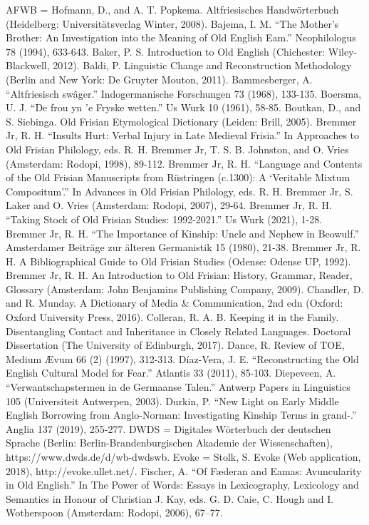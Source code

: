 AFWB = Hofmann, D., and A. T. Popkema. Altfriesisches Handwörterbuch (Heidelberg: Universitätsverlag Winter, 2008).
Bajema, I. M. “The Mother’s Brother: An Investigation into the Meaning of Old English Eam.” Neophilologus 78 (1994), 633-643.
Baker, P. S. Introduction to Old English (Chichester: Wiley-Blackwell, 2012).
Baldi, P. Linguistic Change and Reconstruction Methodology (Berlin and New York: De Gruyter Mouton, 2011).
Bammesberger, A. “Altfriesisch swâger.” Indogermanische Forschungen 73 (1968), 133-135.
Boersma, U. J. “De frou yn 'e Fryske wetten.” Us Wurk 10 (1961), 58-85.
Boutkan, D., and S. Siebinga. Old Frisian Etymological Dictionary (Leiden: Brill, 2005).
Bremmer Jr, R. H. “Insults Hurt: Verbal Injury in Late Medieval Frisia.” In Approaches to Old Frisian Philology, eds. R. H. Bremmer Jr, T. S. B. Johnston, and O. Vries (Amsterdam: Rodopi, 1998), 89-112.
Bremmer Jr, R. H. “Language and Contents of the Old Frisian Manuscripts from Rüstringen (c.1300): A ‘Veritable Mixtum Compositum’.” In Advances in Old Frisian Philology, eds. R. H. Bremmer Jr, S. Laker and O. Vries (Amsterdam: Rodopi, 2007), 29-64.
Bremmer Jr, R. H. “Taking Stock of Old Frisian Studies: 1992-2021.” Us Wurk (2021), 1-28.
Bremmer Jr, R. H. “The Importance of Kinship: Uncle and Nephew in Beowulf.” Amsterdamer Beiträge zur älteren Germanistik 15 (1980), 21-38.
Bremmer Jr, R. H. A Bibliographical Guide to Old Frisian Studies (Odense: Odense UP, 1992).
Bremmer Jr, R. H. An Introduction to Old Frisian: History, Grammar, Reader, Glossary (Amsterdam: John Benjamins Publishing Company, 2009).
Chandler, D. and R. Munday. A Dictionary of Media \& Communication, 2nd edn (Oxford: Oxford University Press, 2016).
Colleran, R. A. B. Keeping it in the Family. Disentangling Contact and Inheritance in Closely Related Languages. Doctoral Dissertation (The University of Edinburgh, 2017).
Dance, R. Review of TOE, Medium Ævum 66 (2) (1997), 312-313.
Díaz-Vera, J. E. “Reconstructing the Old English Cultural Model for Fear.” Atlantis 33 (2011), 85-103.
Diepeveen, A. “Verwantschapstermen in de Germaanse Talen.” Antwerp Papers in Linguistics 105 (Universiteit Antwerpen, 2003).
Durkin, P. “New Light on Early Middle English Borrowing from Anglo-Norman: Investigating Kinship Terms in grand-.” Anglia 137 (2019), 255-277.
DWDS = Digitales Wörterbuch der deutschen Sprache (Berlin: Berlin-Brandenburgischen Akademie der Wissenschaften), https://www.dwds.de/d/wb-dwdswb.
Evoke = Stolk, S. Evoke (Web application, 2018), http://evoke.ullet.net/.
Fischer, A. “Of Fæderan and Eamas: Avuncularity in Old English.” In The Power of Words: Essays in Lexicography, Lexicology and Semantics in Honour of Christian J. Kay, eds. G. D. Caie, C. Hough and I. Wotherspoon (Amsterdam: Rodopi, 2006), 67–77.
